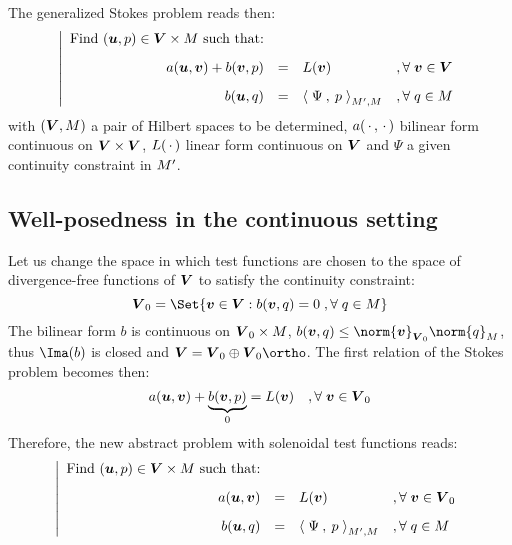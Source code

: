 \medskip
The generalized Stokes problem reads then:
\begin{equation}\label{pb:genstokes_weak}
\left\vert
\begin{array}{rlll}
\mbox{Find $({{\boldsymbol u}},p)\in \boldsymbol{{V}}\times{M}$ such that:}\\[2ex]
\displaystyle a({{\boldsymbol u}},{{\boldsymbol v}}) + b({{\boldsymbol v}}, p) &=& L({{\boldsymbol v}})& ,{\forall\;}{{\boldsymbol v}}\in\boldsymbol{{V}}\\[2ex]
\displaystyle b({{\boldsymbol u}},q) &=& \mathbf{\langle}\;\Psi\:,\: p \;\mathbf{\rangle}_{{M}',{M}} & ,{\forall\;} q\in{M}
\end{array}
\right.
\end{equation}
with $(\boldsymbol{{V}},{M})$ a pair of Hilbert spaces to be determined, $a(\,{\mathbf\cdot}\,,\,{\mathbf\cdot}\,)$ bilinear form continuous on $\boldsymbol{{V}}\times\boldsymbol{{V}}$, $L(\,{\mathbf\cdot}\,)$ linear form continuous on $\boldsymbol{{V}}$ and $\Psi$ a given continuity constraint in ${M}'$.

\subsection{Well-posedness in the continuous setting}

Let us change the space in which test functions are chosen to the space of divergence-free functions of $\boldsymbol{{V}}$ to satisfy the continuity constraint:
\begin{equation*}
\xVd_{0} = \Set{ \vv\in\xVd : b(\vv,q) = 0\;,\forany q\in\xM }
\end{equation*}
The bilinear form $b$ is continuous on $\boldsymbol{{V}}_{0}\times{M}$, \ie $b(\vv,q) \leq \norm{\vv}_{\xVd_{0}} \norm{q}_{\xM}$, thus $\Ima(b)$ is closed and $\xVd = \xVd_{0} \oplus \xVd_{0}\ortho$.
The first relation of the Stokes problem becomes then:
\begin{equation*}
a({{\boldsymbol u}},{{\boldsymbol v}}) + \underbrace{b({{\boldsymbol v}}, p)}_{0} = L({{\boldsymbol v}})\quad,{\forall\;}{{\boldsymbol v}}\in\boldsymbol{{V}}_{0}
\end{equation*}
Therefore, the new abstract problem with solenoidal test functions reads:
\begin{equation*}\label{pb:stokes_solenoidal}
\left\vert
\begin{array}{rlll}
\mbox{Find $({{\boldsymbol u}},p)\in \boldsymbol{{V}}\times{M}$ such that:}\\[2ex]
\displaystyle a({{\boldsymbol u}},{{\boldsymbol v}}) &=& L({{\boldsymbol v}})& ,{\forall\;}{{\boldsymbol v}}\in\boldsymbol{{V}}_{0}\\[2ex]
\displaystyle b({{\boldsymbol u}},q)   &=& \mathbf{\langle}\;\Psi\:,\: p \;\mathbf{\rangle}_{{M}',{M}} & ,{\forall\;} q\in{M}
\end{array}
\right.
\end{equation*}

